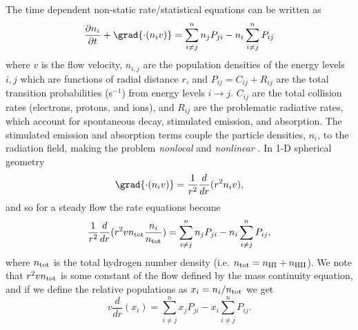 The time dependent non-static rate/statistical equations can be written as
\begin{equation}
\frac{\partial n_{i}}{\partial t}+\grad{\cdot(n_{i}v)} = \sum_{i\neq j}^n n_{j}P_{ji} - n_{i}\sum_{i\neq j}^n P_{ij} 
\end{equation}
where $v$ is the flow velocity, $n_{i,j}$ are the population densities of the energy levels $i,j$ which are functions of radial distance $r$, and  $P_{ij}=C_{ij}+R_{ij}$ are the total transition probabilities (s$^{-1}$) from energy levels $i \rightarrow j$. $C_{ij}$ are the total collision rates (electrons, protons, and ions), and $R_{ij}$ are the problematic radiative rates, which account for spontaneous decay, stimulated emission, and absorption. The stimulated emission and absorption terms couple the particle densities, $n_{i}$, to the radiation field, making the problem \textit{nonlocal} and \textit{nonlinear} \citep{scharmer_1985}. In 1-D spherical geometry
\begin{equation}
\grad{\cdot(n_{i}v)} = \frac{1}{r^2}\frac{d}{dr}(r^2 n_{i}v),
\end{equation}
and so for a steady flow the rate equations become
\begin{equation}
\frac{1}{r^2}\frac{d}{dr}(r^2 vn_{\rm{tot}}\frac{n_{i}}{n_{\rm{tot}}}) = \sum_{i\neq j}^{n} n_{j}P_{ji} - n_{i}\sum_{i\neq j}^n P_{ij},
\end{equation}
where $n_{\rm{tot}}$ is the total hydrogen number density (i.e. $n_{\rm{tot}} = n_{\rm{HI}}+n_{\rm{HII}}$).
We note that $r^2 vn_{\rm{tot}}$ is some constant of the flow defined by the mass continuity equation, and if we define the relative populations as $x_{i}=n_{i}/n_{\rm{tot}}$ we get
\begin{equation}
v\frac{d}{dr}(x_{i}) = \sum_{i\neq j}^{n} x_{j}P_{ji} - x_{i}\sum_{i\neq j}^n P_{ij}.
\label{eq:eq6.9.1}
\end{equation}

